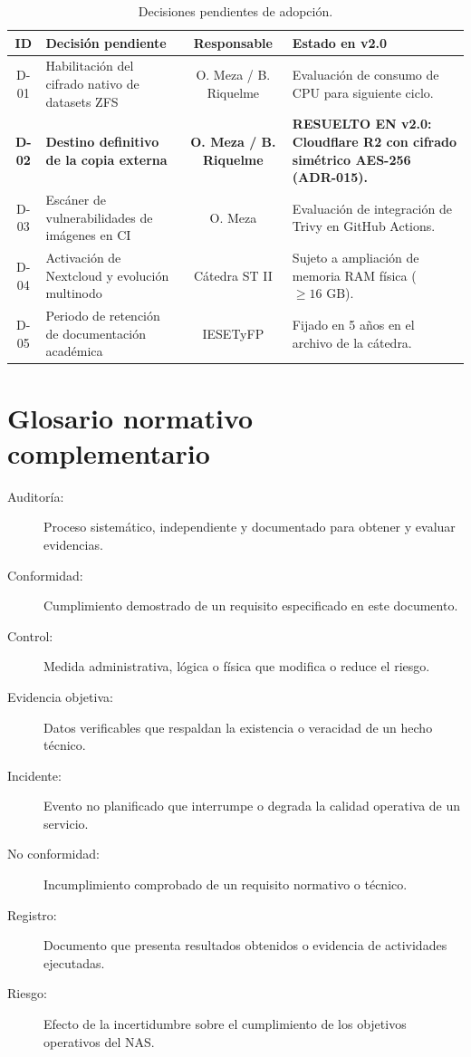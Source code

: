 \documentclass[10pt,a4paper]{article}
\begin{document}
\begin{table}[htbp]
\centering
\small
\caption{Decisiones pendientes de adopción.}
\label{tab:decisiones_pendientes}
\begin{tabular}{|c|p{6.5cm}|c|p{4cm}|}
\hline
\textbf{\textsf{ID}} & \textbf{\textsf{Decisión pendiente}} & \textbf{\textsf{Responsable}} & \textbf{\textsf{Estado en v2.0}} \\
\hline
D-01 & Habilitación del cifrado nativo de datasets ZFS & O. Meza / B. Riquelme & Evaluación de consumo de CPU para siguiente ciclo. \\
\hline
\textbf{D-02} & \textbf{Destino definitivo de la copia externa} & \textbf{O. Meza / B. Riquelme} & \textbf{RESUELTO EN v2.0: Cloudflare R2 con cifrado simétrico AES-256 (ADR-015).} \\
\hline
D-03 & Escáner de vulnerabilidades de imágenes en CI & O. Meza & Evaluación de integración de Trivy en GitHub Actions. \\
\hline
D-04 & Activación de Nextcloud y evolución multinodo & Cátedra ST II & Sujeto a ampliación de memoria RAM física ($\ge 16\text{ GB}$). \\
\hline
D-05 & Periodo de retención de documentación académica & IESETyFP & Fijado en 5 años en el archivo de la cátedra. \\
\hline
\end{tabular}
\end{table}

\section{Glosario normativo complementario}
\begin{description}
    \item[Auditoría:] Proceso sistemático, independiente y documentado para obtener y evaluar evidencias.
    \item[Conformidad:] Cumplimiento demostrado de un requisito especificado en este documento.
    \item[Control:] Medida administrativa, lógica o física que modifica o reduce el riesgo.
    \item[Evidencia objetiva:] Datos verificables que respaldan la existencia o veracidad de un hecho técnico.
    \item[Incidente:] Evento no planificado que interrumpe o degrada la calidad operativa de un servicio.
    \item[No conformidad:] Incumplimiento comprobado de un requisito normativo o técnico.
    \item[Registro:] Documento que presenta resultados obtenidos o evidencia de actividades ejecutadas.
    \item[Riesgo:] Efecto de la incertidumbre sobre el cumplimiento de los objetivos operativos del NAS.
\end{description}
\end{document}
